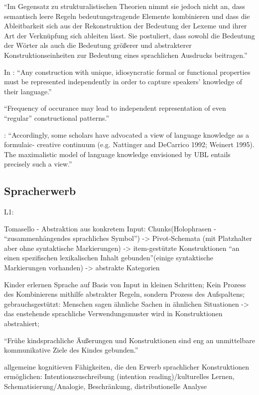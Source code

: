 \begin{itemize}
    ``Im Gegensatz zu strukturalistischen Theorien nimmt sie jedoch nicht an, dass semantisch leere Regeln bedeutungstragende Elemente kombinieren und dass die Ableitbarkeit sich aus der Rekonstruktion der Bedeutung der Lexeme und ihrer Art der Verknüpfung sich ableiten lässt.
    Sie postuliert, dass sowohl die Bedeutung der Wörter als auch die Bedeutung größerer und abstrakterer Konstruktionseinheiten zur Bedeutung eines sprachlichen Ausdrucks beitragen.''

    In \cite{Ellis08}: ``Any construction with unique, idiosyncratic formal or functional properties must be represented independently in order to capture speakers' knowledge of their language.''

    ``Frequency of occurance may lead to independent representation of even ``regular'' constructional patterns.''

    \cite{Eskildsen08}: ``Accordingly,
    some scholars have advocated a view of language knowledge as a formulaic-
    creative continuum (e.g. Nattinger and DeCarrico 1992; Weinert 1995). The
    maximalistic model of language knowledge envisioned by UBL entails
    precisely such a view.''
\end{itemize}

\subsection{Spracherwerb}
    L1:

    Tomasello - Abstraktion aus konkretem Input: Chunks(Holophrasen - ``zusammenhängendes sprachliches Symbol'') -> Pivot-Schemata (mit Platzhalter aber ohne syntaktische Markierungen) -> item-gestützte Konstruktionen ``an einen spezifischen lexikalischen Inhalt gebunden''(einige syntaktische Markierungen vorhanden) -> abstrakte Kategorien

        \cite{Tomasello06} Kinder erlernen Sprache auf Basis von Input in kleinen Schritten;
        Kein Prozess des Kombinierens mithilfe abstrakter Regeln, sondern Prozess des Aufspaltens;
        gebrauchsgestützt: Menschen sagen ähnliche Sachen in ähnlichen Situationen -> das enstehende sprachliche Verwendungsmuster wird in Konstruktionen abstrahiert;

        ``Frühe kindsprachliche Äußerungen und Konstruktionen sind eng an unmittelbare kommunikative Ziele des Kindes gebunden.''

        allgemeine kognitieven Fähigkeiten, die den Erwerb sprachlicher Konstruktionen ermöglichen: Intentionszuschreibung (intention reading)/kulturelles Lernen, Schematisierung/Analogie, Beschränkung, distributionelle Analyse


